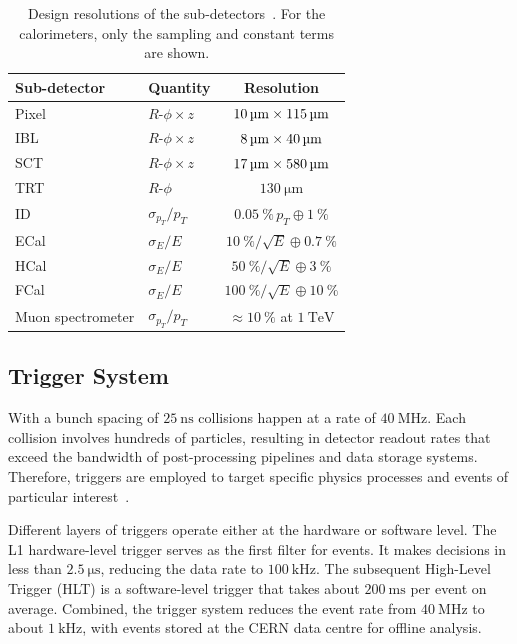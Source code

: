 \begin{table}[ht]
    \centering
    \caption{Design resolutions of the \atlas sub-detectors~\cite{atlas_jinst}. For the calorimeters, only the sampling and constant terms are shown.}
    \label{tab:resolutions}
    \begin{tabular}{llc}
        \toprule
        Sub-detector & Quantity & Resolution \\
        \midrule
        Pixel  & $R\text{-}\phi\times z$ & $\qtyproduct{10 x 115}{\micro\metre}$ \\
        IBL    & $R\text{-}\phi\times z$ & $\qtyproduct{8 x 40}{\micro\metre}$ \\
        SCT    & $R\text{-}\phi\times z$ & $\qtyproduct{17 x 580}{\micro\metre}$ \\
        TRT    & $R\text{-}\phi$         & $\qty{130}{\micro\metre}$ \\
        ID     & $\sigma_{p_T}/p_T$      & $\qty{0.05}{\percent}\,p_T\oplus\qty{1}{\percent}$ \\
        ECal   & $\sigma_E/E$            & $\qty{10}{\percent}/\sqrt{E}\oplus\qty{0.7}{\percent}$ \\
        HCal   & $\sigma_E/E$            & $\qty{50}{\percent}/\sqrt{E}\oplus\qty{3}{\percent}$ \\
        FCal   & $\sigma_E/E$            & $\qty{100}{\percent}/\sqrt{E}\oplus\qty{10}{\percent}$ \\
        Muon spectrometer & $\sigma_{p_T}/p_T$ & $\approx\qty{10}{\percent}$ at $\qty{1}{\tera\electronvolt}$ \\
        \bottomrule
    \end{tabular}
\end{table}

\subsection{Trigger System}
With a bunch spacing of $\qty{25}{\nano\second}$ \cite{ATLAS:2019pzw} collisions happen at a rate of $\qty{40}{\mega\hertz}$. Each collision involves hundreds of particles, resulting in detector readout rates that exceed the bandwidth of post-processing pipelines and data storage systems. Therefore, triggers are employed to target specific physics processes and events of particular interest~\cite{atlas_trigger_run2}.

Different layers of triggers operate either at the hardware or software level. The L1 hardware-level trigger serves as the first filter for events. It makes decisions in less than $\qty{2.5}{\micro\second}$, reducing the data rate to $\qty{100}{\kilo\hertz}$. The subsequent High-Level Trigger (HLT) is a software-level trigger that takes about $\qty{200}{\milli\second}$ per event on average. Combined, the trigger system reduces the event rate from $\qty{40}{\mega\hertz}$ to about $\qty{1}{\kilo\hertz}$, with events stored at the CERN data centre for offline analysis.